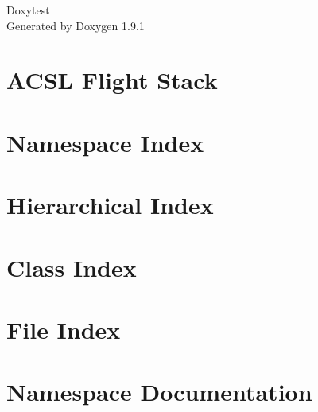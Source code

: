 \let\mypdfximage\pdfximage\def\pdfximage{\immediate\mypdfximage}\documentclass[twoside]{book}
\newcommand{\+}{\discretionary{\mbox{\scriptsize$\hookleftarrow$}}{}{}}
\newcommand{\clearemptydoublepage}{%
  \newpage{\pagestyle{empty}\cleardoublepage}%
}
\begin{document}
\raggedbottom

\hypersetup{pageanchor=false,
             bookmarksnumbered=true,
             pdfencoding=unicode
            }
\begin{titlepage}
\vspace*{7cm}
\begin{center}%
{\Large Doxytest }\\
\vspace*{1cm}
{\large Generated by Doxygen 1.9.1}\\
\end{center}
\end{titlepage}
\clearemptydoublepage
{}
\tableofcontents
\clearemptydoublepage
{}
\hypersetup{pageanchor=true}

\chapter{ACSL Flight Stack}
\label{index}\hypertarget{index}{}
\chapter{Namespace Index}

\chapter{Hierarchical Index}

\chapter{Class Index}

\chapter{File Index}

\chapter{Namespace Documentation}








\end{document}

